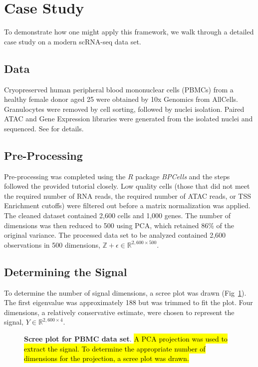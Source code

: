 \documentclass[10pt,letterpaper]{article}
\begin{document}
\section*{Case Study}
To demonstrate how one might apply this framework, we walk through a detailed case study on a modern scRNA-seq data set.

\subsection*{Data}
Cryopreserved human peripheral blood mononuclear cells (PBMCs) from a healthy female donor aged 25 were obtained by 10x Genomics from AllCells. Granulocytes were removed by cell sorting, followed by nuclei isolation. Paired ATAC and Gene Expression libraries were generated from the isolated nuclei and sequenced. See \cite{BPCells data} for details.

\subsection*{Pre-Processing}
Pre-processing was completed using the $R$ package \textit{BPCells} and the steps followed the provided tutorial \cite{BPCells tutorial} closely. Low quality cells (those that did not meet the required number of RNA reads, the required number of ATAC reads, or TSS Enrichment cutoffs) were filtered out before a matrix normalization was applied. The cleaned dataset contained 2,600 cells and 1,000 genes. The number of dimensions was then reduced to 500 using PCA, which retained 86\% of the original variance. The processed data set to be analyzed contained 2,600 observations in 500 dimensions, $\mathbb{Z + \epsilon} \in \mathbb{R}^{2,600 \times 500}$.

\subsection*{Determining the Signal}
To determine the number of signal dimensions, a scree plot was drawn (Fig~\ref{fig15}). The first eigenvalue was approximately 188 but was trimmed to fit the plot. Four dimensions, a relatively conservative estimate, were chosen to represent the signal, $Y \in \mathbb{R}^{2,600 \times 4}$.

\begin{figure}[!h]
\caption{{\bf Scree plot for PBMC data set}.
\hl{A PCA projection was used to extract the signal. To determine the appropriate number of dimensions for the projection, a scree plot was drawn.}}
\label{fig15}
\end{figure}
\end{document}
